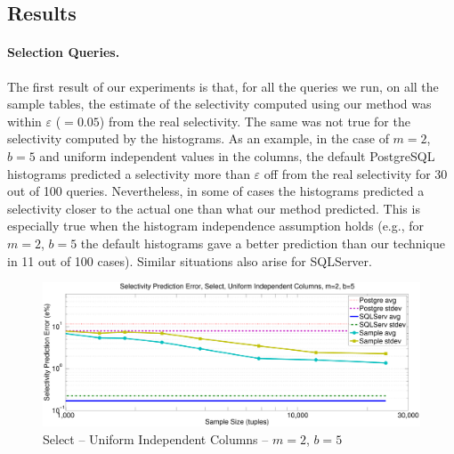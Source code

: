 \subsection{Results}
\paragraph{Selection Queries.} The first result of our experiments is that, for
all the queries we run, on all the sample tables, the estimate of the
selectivity computed using our method was within
$\varepsilon$ ($=0.05$) from the real selectivity. The same was not true for the
selectivity computed by the histograms. As an example, in the case of $m=2$,
$b=5$ and uniform independent values in the columns, the default PostgreSQL
histograms predicted a selectivity more than $\varepsilon$ off from the real
selectivity for 30 out of 100 queries.  Nevertheless, in some of cases the
histograms predicted a selectivity closer to the actual one than what our method
predicted. This is especially true when the histogram independence assumption
holds (e.g., for $m=2$, $b=5$ the default histograms gave a better prediction
than our technique in 11 out of 100 cases). Similar situations also arise for
SQLServer.

\begin{figure}[ht]
  \centering
  \includegraphics[scale=0.35]{vcfreq/T_k5_u200k_unif_k2_b5_errperc}
  \caption{Select -- Uniform Independent Columns -- $m=2$, $b=5$}
  \label{fig:T_k5_u200k_unif_k2_b5_errperc}
\end{figure}

